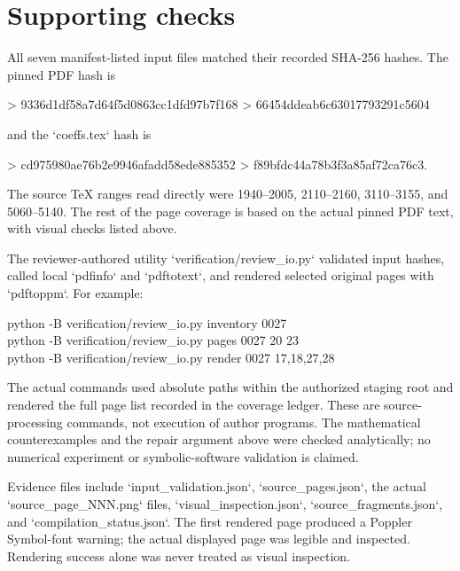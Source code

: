 \documentclass[10pt]{article}
\begin{document}
\section*{Supporting checks}
All seven manifest-listed input files matched their recorded SHA-256 hashes. The pinned PDF hash is\par
> 9336d1df58a7d64f5d0863cc1dfd97b7f168
> 66454ddeab6c63017793291c5604\par
and the `coeffs.tex` hash is\par
> cd975980ae76b2e9946afadd58ede885352
> f89bfdc44a78b3f3a85af72ca76c3.\par
The source TeX ranges read directly were 1940–2005, 2110–2160, 3110–3155, and 5060–5140. The rest of the page coverage is based on the actual pinned PDF text, with visual checks listed above.\par
The reviewer-authored utility `verification/review\_io.py` validated input hashes, called local `pdfinfo` and `pdftotext`, and rendered selected original pages with `pdftoppm`. For example:\par
{\ttfamily\footnotesize python -B verification/review\_io.py inventory 0027\\
python -B verification/review\_io.py pages 0027 20 23\\
python -B verification/review\_io.py render 0027 17,18,27,28}\par
The actual commands used absolute paths within the authorized staging root and rendered the full page list recorded in the coverage ledger. These are source-processing commands, not execution of author programs. The mathematical counterexamples and the repair argument above were checked analytically; no numerical experiment or symbolic-software validation is claimed.\par
Evidence files include `input\_validation.json`, `source\_pages.json`, the actual `source\_page\_NNN.png` files, `visual\_inspection.json`, `source\_fragments.json`, and `compilation\_status.json`. The first rendered page produced a Poppler Symbol-font warning; the actual displayed page was legible and inspected. Rendering success alone was never treated as visual inspection.\par
\end{document}
